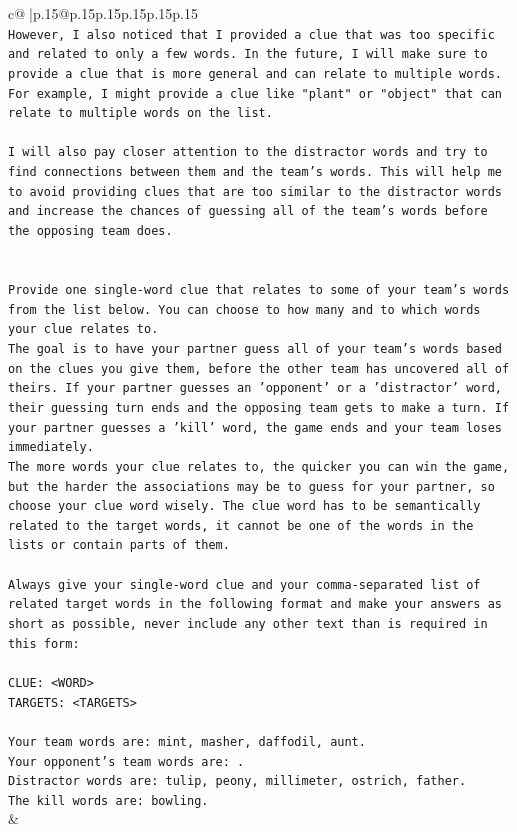 \documentclass{article}
\begin{document}
{\begin{supertabular}{c@{$\;$}|p{.15\linewidth}@{}p{.15\linewidth}p{.15\linewidth}p{.15\linewidth}p{.15\linewidth}p{.15\linewidth}}
{{{\\ 
\texttt{However, I also noticed that I provided a clue that was too specific and related to only a few words. In the future, I will make sure to provide a clue that is more general and can relate to multiple words. For example, I might provide a clue like "plant" or "object" that can relate to multiple words on the list.} \\
\\ 
\texttt{I will also pay closer attention to the distractor words and try to find connections between them and the team's words. This will help me to avoid providing clues that are too similar to the distractor words and increase the chances of guessing all of the team's words before the opposing team does.} \\
\\ 
\\ 
\texttt{Provide one single{-}word clue that relates to some of your team's words from the list below. You can choose to how many and to which words your clue relates to.} \\
\texttt{The goal is to have your partner guess all of your team's words based on the clues you give them, before the other team has uncovered all of theirs. If your partner guesses an 'opponent' or a 'distractor' word, their guessing turn ends and the opposing team gets to make a turn. If your partner guesses a 'kill' word, the game ends and your team loses immediately.} \\
\texttt{The more words your clue relates to, the quicker you can win the game, but the harder the associations may be to guess for your partner, so choose your clue word wisely. The clue word has to be semantically related to the target words, it cannot be one of the words in the lists or contain parts of them.} \\
\\ 
\texttt{Always give your single{-}word clue and your comma{-}separated list of related target words in the following format and make your answers as short as possible, never include any other text than is required in this form:} \\
\\ 
\texttt{CLUE: <WORD>} \\
\texttt{TARGETS: <TARGETS>} \\
\\ 
\texttt{Your team words are: mint, masher, daffodil, aunt.} \\
\texttt{Your opponent's team words are: .} \\
\texttt{Distractor words are: tulip, peony, millimeter, ostrich, father.} \\
\texttt{The kill words are: bowling.} \\
            }
        }
    }
    & \\ \\


\end{supertabular}}
\end{document}
